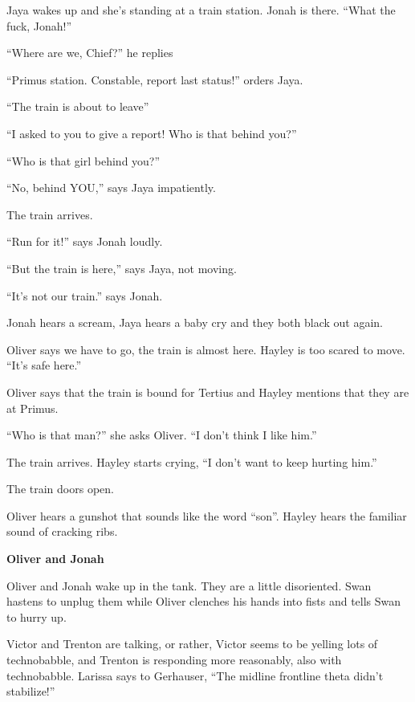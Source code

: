 
Jaya wakes up and she's standing at a train station.  Jonah is there.  ``What the fuck, Jonah!''

``Where are we, Chief?'' he replies

``Primus station.  Constable, report last status!'' orders Jaya.

``The train is about to leave''

``I asked to you to give a report!   Who is that behind you?''

``Who is that girl behind you?''

``No, behind YOU,'' says Jaya impatiently.

The train arrives.

``Run for it!'' says Jonah loudly.

``But the train is here,'' says Jaya, not moving.

``It's not our train.'' says Jonah.

Jonah hears a scream, Jaya hears a baby cry and they both black out again.



Oliver says we have to go, the train is almost here.   Hayley is too scared to move.  ``It's safe here.''

Oliver says that the train is bound for Tertius and Hayley mentions that they are at Primus.

``Who is that man?'' she asks Oliver.  ``I don't think I like him.''  

The train arrives.  Hayley starts crying, ``I don't want to keep hurting him.''

The train doors open.

Oliver hears a gunshot that sounds like the word ``son''.  Hayley hears the familiar sound of cracking ribs.



\textbf{Oliver and Jonah}



Oliver and Jonah wake up in the tank.  They are a little disoriented.  Swan hastens to unplug them while Oliver clenches his hands into fists and tells Swan to hurry up.



Victor and Trenton are talking, or rather, Victor seems to be yelling lots of technobabble, and Trenton is responding more reasonably, also with technobabble.  Larissa says to Gerhauser, ``The midline frontline theta didn't stabilize!''

